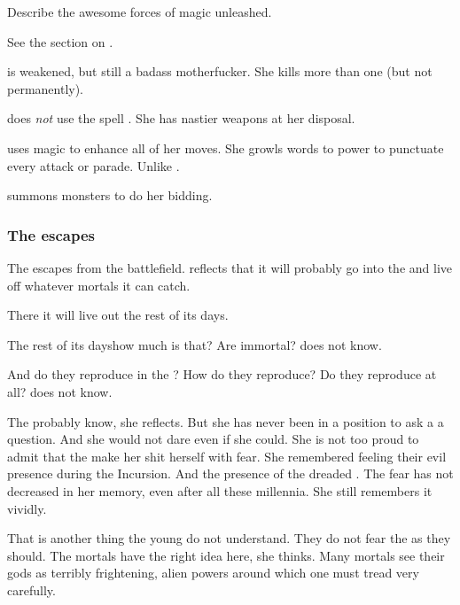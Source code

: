Describe the awesome forces of magic unleashed.

See the section on .

\Nzessuacrith{} is weakened, but still a badass motherfucker. 
She kills more than one \resphan{} (but not permanently). 

\Nzessuacrith{} does \emph{not} use the spell . 
She has nastier weapons at her disposal. 

\Nzessuacrith{} uses magic to enhance all of her moves. 
She growls words to power to punctuate every attack or parade. 
Unlike \Ishnaruchaefir. 

\Nzessuacrith summons monsters to do her bidding.






\subsubsection{The \umbra escapes}
The \umbra{} escapes from the battlefield. 
\Achsah{} reflects that it will probably go into the \Wylde{} and live off whatever mortals it can catch. 

There it will live out the rest of its days. 

The rest of its days\prikker how much is that? 
Are \umbrae{} immortal? 
\Achsah{} does not know. 

And do they reproduce in the \Wylde{}?
How do they reproduce? 
Do they reproduce at all? 
\Achsah{} does not know. 

The \banelords{} probably know, she reflects. 
But she has never been in a position to ask a \banelord{} a question. 
And she would not dare even if she could. 
She is not too proud to admit that the \banelords{} make her shit herself with fear. 
She remembered feeling their evil presence during the Incursion. 
And the presence of the dreaded \Voidbringer. 
The fear has not decreased in her memory, even after all these millennia. 
She still remembers it vividly. 

That is another thing the young \resphain{} do not understand. 
They do not fear the \banes{} as they should. 
The mortals have the right idea here, she thinks. 
Many mortals see their gods as terribly frightening, alien powers around which one must tread very carefully.

